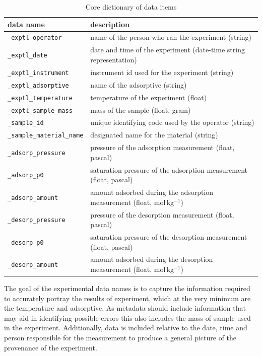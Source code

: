 \documentclass[journal=langd5,manuscript=article]{achemso}
\begin{document}
\begin{table}
  \caption{Core dictionary of data items}
  \label{tbl:example}
  \begin{tabular}{@{}ll@{}}
    \toprule
    data name & description  \\
    \midrule
    \texttt{\_exptl\_operator}  & name of the person who ran the experiment (string)  \\
    \texttt{\_exptl\_date} & date and time of the experiment (date-time string representation) \\
    \texttt{\_exptl\_instrument}  & instrument id used for the experiment (string)  \\
    \texttt{\_exptl\_adsorptive}  & name of the adsorptive (string)  \\
    \texttt{\_exptl\_temperature}  & temperature of the experiment (float)  \\
    \texttt{\_exptl\_sample\_mass}  & mass of the sample (float, gram) \\
    \texttt{\_sample\_id}  & unique identifying code used by the operator (string)\\
    \texttt{\_sample\_material\_name}  & designated name for the material (string) \\
    \texttt{\_adsorp\_pressure} & pressure of the adsorption measurement (float, pascal)\\
    \texttt{\_adsorp\_p0} & saturation pressure of the adsorption measurement (float, pascal) \\
    \texttt{\_adsorp\_amount} & amount adsorbed during the adsorption measurement (float, mol$\,$kg$^{-1}$) \\
    \texttt{\_desorp\_pressure} & pressure of the desorption measurement (float, pascal) \\
    \texttt{\_desorp\_p0} & saturation pressure of the desorption measurement (float, pascal) \\
    \texttt{\_desorp\_amount} & amount adsorbed during the desorption measurement (float, mol$\,$kg$^{-1}$) \\
    \bottomrule
  \end{tabular}
\end{table}

The goal of the experimental data names is to capture the information required to accurately portray the results of experiment, which at the very minimum are the temperature and adsorptive.
As metadata should include information that may aid in identifying possible errors this also includes the mass of sample used in the experiment.
Additionally, data is included relative to the date, time and person responsible for the measurement to produce a general picture of the provenance of the experiment.
\end{document}
